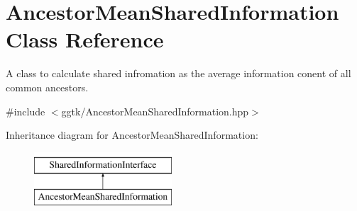 \hypertarget{classAncestorMeanSharedInformation}{}\section{Ancestor\+Mean\+Shared\+Information Class Reference}
\label{classAncestorMeanSharedInformation}


A class to calculate shared infromation as the average information conent of all common ancestors.  




{\ttfamily \#include $<$ggtk/\+Ancestor\+Mean\+Shared\+Information.\+hpp$>$}

Inheritance diagram for Ancestor\+Mean\+Shared\+Information\+:\begin{figure}[H]
\begin{center}
\leavevmode
\includegraphics[height=2.000000cm]{classAncestorMeanSharedInformation}
\end{center}
\end{figure}

